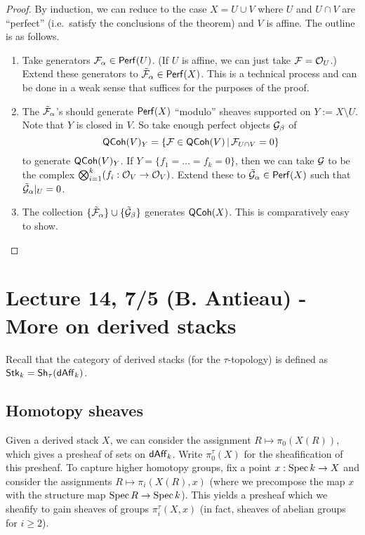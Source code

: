 \documentclass{amsart}
\begin{document}
\begin{proof}
	By induction, we can reduce to the case $X = U \cup V$ where $U$ and $U \cap V$ are ``perfect'' (i.e.\ satisfy the conclusions of the theorem) and $V$ is affine.
	The outline is as follows.
	\begin{enumerate}
		\item Take generators $\mathcal{F}_\alpha \in \mathsf{Perf}(U)$.
			(If $U$ is affine, we can just take $\mathcal{F} = \mathcal{O}_U$.)
			Extend these generators to $\tilde{\mathcal{F}}_\alpha \in \mathsf{Perf}(X)$.
			This is a technical process and can be done in a weak sense that suffices for the purposes of the proof.
		\item The $\tilde{\mathcal{F}}_\alpha$'s should generate $\mathsf{Perf}(X)$ ``modulo'' sheaves supported on $Y := X \setminus U$.
			Note that $Y$ is closed in $V$.
			So take enough perfect objects $\mathcal{G}_\beta$ of 
			\[
				\mathsf{QCoh}(V)_Y = \{ \mathcal{F} \in \mathsf{QCoh}(V) \, | \, \mathcal{F}_{U \cap V} = 0 \}
			\]
			to generate $\mathsf{QCoh}(V)_Y$.
			If $Y = \{ f_1 = \dots = f_k = 0 \}$, then we can take $\mathcal{G}$ to be the complex $\bigotimes_{i=1}^k (f_i: \mathcal{O}_V \to \mathcal{O}_V)$.
			Extend these to $\tilde{\mathcal{G}}_\alpha \in \mathsf{Perf}(X)$ such that $\tilde{\mathcal{G}}_\alpha|_U = 0$.
		\item The collection $\{\tilde{\mathcal{F}}_\alpha\} \cup \{\tilde{\mathcal{G}}_\beta\}$ generates $\mathsf{QCoh}(X)$.
			This is comparatively easy to show.
	\end{enumerate}
\end{proof}

\section{Lecture 14, 7/5 (B. Antieau) - More on derived stacks}

Recall that the category of derived stacks (for the $\tau$-topology) is defined as $\mathsf{Stk}_k = \mathsf{Sh}_\tau(\mathsf{dAff}_k)$.

\subsection{Homotopy sheaves}

Given a derived stack $X$, we can consider the assignment $R \mapsto \pi_0(X(R))$, which gives a presheaf of sets on $\mathsf{dAff}_k$.
Write $\pi_0^\tau(X)$ for the sheafification of this presheaf.
To capture higher homotopy groups, fix a point $x: \operatorname{Spec} k \to X$ and consider the assignments $R \mapsto \pi_i(X(R), x)$ (where we precompose the map $x$ with the structure map $\operatorname{Spec} R \to \operatorname{Spec} k$).
This yields a presheaf which we sheafify to gain sheaves of groups $\pi_i^\tau(X, x)$ (in fact, sheaves of abelian groups for $i \geq 2$).
\end{document}

